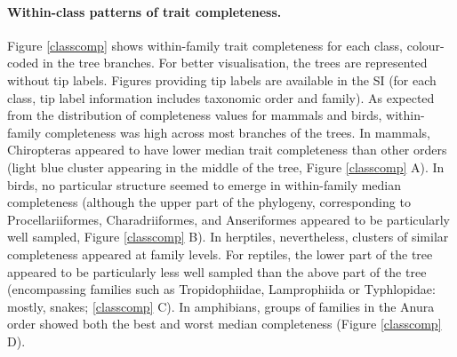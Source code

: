 \paragraph{Within-class patterns of trait completeness.}
Figure \ref{classcomp} shows within-family trait completeness for each class, colour-coded in the tree branches. For better visualisation, the trees are represented without tip labels. Figures providing tip labels are available in the SI (for each class, tip label information includes taxonomic order and family). As expected from the distribution of completeness values for mammals and birds, within-family completeness was high across most branches of the trees. In mammals, Chiropteras appeared to have lower median trait completeness than other orders (light blue cluster appearing in the middle of the tree, Figure \ref{classcomp} A). In birds, no particular structure seemed to emerge in within-family median completeness (although the upper part of the phylogeny, corresponding to Procellariiformes, Charadriiformes, and Anseriformes appeared to be particularly well sampled, Figure \ref{classcomp} B). In herptiles, nevertheless, clusters of similar completeness appeared at family levels. For reptiles, the lower part of the tree appeared to be particularly less well sampled than the above part of the tree (encompassing families such as Tropidophiidae, Lamprophiida or Typhlopidae: mostly, snakes; \ref{classcomp} C). In amphibians, groups of families in the Anura order showed both the best and worst median completeness (Figure \ref{classcomp} D). 


